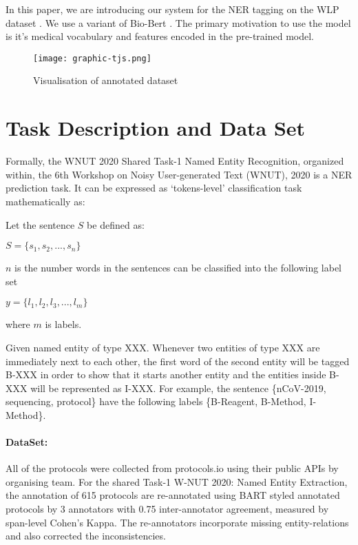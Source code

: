 \documentclass[11pt,a4paper]{article}
\begin{document}
In this paper, we are introducing our system for the NER tagging on the WLP dataset \citep{kulkarni2018wetlab}. We use a variant of Bio-Bert \citep{10.1093/bioinformatics/btz682}. The primary motivation to use the model is it's medical vocabulary and features encoded in the pre-trained model.

\begin{figure*}
\centering
   \texttt{[image: graphic-tjs.png]}
\caption{Visualisation of annotated dataset \footnotemark}
\label{data-formate}
\end{figure*}



\section{Task Description and Data Set}

Formally, the WNUT 2020 Shared Task-1 Named Entity Recognition, organized within, the 6th Workshop on Noisy User-generated Text (WNUT), 2020 \cite{tabassum2020wlp} is a NER prediction task. It can be expressed as `tokens-level' classification task mathematically as:

Let the sentence \(S\) be defined as:

$S = \{ s_1, s_2, ..., s_n \}$

$n$ is the number words in the sentences can be classified into the following label set 

$y = \{l_1,l_2,l_3, ..., l_m\}$

where $m$ is labels.

Given named entity of type XXX. Whenever two entities of
type XXX are immediately next to each other, the
first word of the second entity will be tagged B-XXX
in order to show that it starts another entity and the entities inside B-XXX will be represented as I-XXX. For example, the sentence  \{nCoV-2019, sequencing, protocol\} have the following labels \{B-Reagent, B-Method, I-Method\}.





\paragraph{DataSet:}  All of the protocols \cite{kulkarni2018wetlab} were collected from protocols.io using their public APIs by organising team. For the shared Task-1 W-NUT 2020: Named Entity Extraction, the annotation of 615 protocols are re-annotated using BART styled annotated protocols by 3 annotators with 0.75 inter-annotator agreement, measured by span-level Cohen's Kappa. The re-annotators incorporate missing entity-relations and also corrected the inconsistencies.
\end{document}
